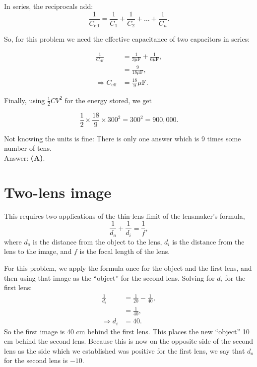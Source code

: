 \documentclass[11pt]{paper}
\newcommand{\answer}[1]{Answer: \textbf{(#1)}.}
\begin{document}
In series, the reciprocals add:
\begin{equation}
\frac{1}{C_{\text{eff}}} =\frac{1}{C_1} + \frac{1}{C_2} + \dots + \frac{1}{C_n}.
\end{equation}

So, for this problem we need the effective capacitance of two capacitors in series:

\begin{align}
\frac{1}{C_\text{eff}} &= \frac{1}{3\mu\text{F}} + \frac{1}{6\mu\text{F}},\\
&= \frac{9}{18\mu\text{F}},\\
\Rightarrow C_\text{eff} &= \frac{18}{9}\mu\text{F}.
\end{align}

Finally, using $\frac{1}{2}CV^2$ for the energy stored, we get 

\begin{equation}
\frac{1}{2} \times \frac{18}{9} \times 300^2 = 300^2 = 900,000.
\end{equation}

Not knowing the units is fine: There is only one answer which is 9 times some number of tens.\\

\answer{A}

\section{Two-lens image}

This requires two applications of the thin-lens limit of the lensmaker's formula,
\begin{equation}
\frac{1}{d_o} + \frac{1}{d_i} = \frac{1}{f},
\end{equation}
where $d_o$ is the distance from the object to the lens, $d_i$ is the distance from the lens to the image, and $f$ is the focal length of the lens.

For this problem, we apply the formula once for the object and the first lens, and then using that image as the ``object'' for the second lens.  Solving for $d_i$ for the first lens:
\begin{align}
\frac{1}{d_i} &= \frac{1}{20} - \frac{1}{40},\\
&= \frac{1}{40},\\
\Rightarrow d_i &= 40.
\end{align}
So the first image is 40 cm behind the first lens.  This places the new ``object'' 10 cm behind the second lens.  Because this is now on the opposite side of the second lens as the side which we established was positive for the first lens, we say that $d_o$ for the second lens is $-10$.
\end{document}
